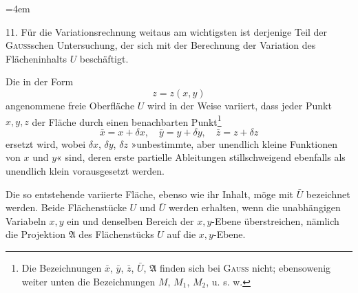 \clearpage\begingroup
\emergencystretch=4em\relax\NoSourceHead{}
\makeatletter\tagsleft@true\let\veqno\@@leqno\makeatother
\renewcommand{\thefootnote}{\arabic{footnote})}\setcounter{footnote}{34}
\begin{center}\end{center}
\noindent\hspace*{\parindent}11. Für die Variationsrechnung weitaus am wichtigsten ist derjenige Teil
der \textsc{Gauss}schen Untersuchung, der sich mit der Berechnung der Variation des
Flächeninhalts $U$ beschäftigt.

Die in der Form
\begin{equation*}
z=z(x,y)\tag{28}
\end{equation*}
angenommene freie Oberfläche $U$ wird in der Weise variiert, dass jeder Punkt
$x,y,z$ der Fläche durch einen benachbarten Punkt\footnote{Die Bezeichnungen $\bar x$, $\bar y$, $\bar z$, $\bar U$, $\mathfrak{A}$ finden sich bei \textsc{Gauss} nicht; ebensowenig weiter unten die Bezeichnungen $M$, $M_1$, $M_2$, u. s. w.}
\begin{equation*}
\bar x=x+\delta x,\quad\bar y=y+\delta y,\quad\bar z=z+\delta z\tag{29}
\end{equation*}
ersetzt wird, wobei $\delta x$, $\delta y$, $\delta z$ »unbestimmte, aber unendlich kleine Funktionen
von $x$ und $y$« sind, deren erste partielle Ableitungen stillschweigend ebenfalls
als unendlich klein vorausgesetzt werden.

Die so entstehende variierte Fläche, ebenso wie ihr Inhalt, möge mit
$\bar U$ bezeichnet werden. Beide Flächenstücke $U$ und $\bar U$ werden erhalten, wenn
die unabhängigen Variabeln $x,y$ ein und denselben Bereich der $x,y$-Ebene
überstreichen, nämlich die Projektion $\mathfrak{A}$ des Flächenstücks $U$ auf die $x,y$-Ebene.

